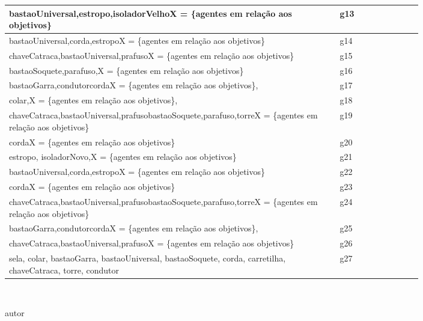 \begin{center}
\begin{longtable}[H]{|p{0.8\linewidth}|l|}
bastaoUniversal,estropo,isoladorVelhoX = \{agentes em relação aos objetivos\}                                      & g13        \\ \hline
bastaoUniversal,corda,estropoX = \{agentes em relação aos objetivos\}                                              & g14        \\ \hline
chaveCatraca,bastaoUniversal,prafusoX = \{agentes em relação aos objetivos\}                                       & g15        \\ \hline
bastaoSoquete,parafuso,X = \{agentes em relação aos objetivos\}                                                    & g16        \\ \hline
bastaoGarra,condutorcordaX = \{agentes em relação aos objetivos\},                                                 & g17        \\ \hline
colar,X = \{agentes em relação aos objetivos\},                                                                    & g18        \\ \hline
chaveCatraca,bastaoUniversal,prafusobastaoSoquete,parafuso,torreX = \{agentes em relação aos objetivos\}           & g19        \\ \hline
cordaX = \{agentes em relação aos objetivos\}                                                                      & g20        \\ \hline
estropo, isoladorNovo,X = \{agentes em relação aos objetivos\}                                                     & g21        \\ \hline
bastaoUniversal,corda,estropoX = \{agentes em relação aos objetivos\}                                              & g22        \\ \hline
cordaX = \{agentes em relação aos objetivos\}                                                                      & g23        \\ \hline
chaveCatraca,bastaoUniversal,prafusobastaoSoquete,parafuso,torreX = \{agentes em relação aos objetivos\}           & g24        \\ \hline
bastaoGarra,condutorcordaX = \{agentes em relação aos objetivos\},                                                 & g25        \\ \hline
chaveCatraca,bastaoUniversal,prafusoX = \{agentes em relação aos objetivos\}                                       & g26        \\ \hline
sela, colar, bastaoGarra, bastaoUniversal, bastaoSoquete, corda, carretilha, chaveCatraca, torre, condutor		   & g27        \\ \hline
\end{longtable}
\\
\begin{center}
autor
\end{center}
\end{center}




